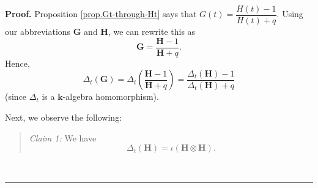 \documentclass[numbers=enddot,12pt,final,onecolumn,notitlepage]{scrartcl}%
\theoremstyle{definition}
\newenvironment{statement}{\begin{quote}}{\end{quote}}
\newenvironment{proof}[1][Proof]{\noindent\textbf{#1.} }{\ \rule{0.5em}{0.5em}}
\begin{document}
\begin{proof}
Proposition \ref{prop.Gt-through-Ht} says that $G\left(  t\right)
=\dfrac{H\left(  t\right)  -1}{H\left(  t\right)  +q}$. Using our
abbreviations $\mathbf{G}$ and $\mathbf{H}$, we can rewrite this as%
\begin{equation}
\mathbf{G}=\dfrac{\mathbf{H}-1}{\mathbf{H}+q}.
\label{pf.thm.Deltaetastara.G-via-H}%
\end{equation}
Hence,%
\begin{equation}
\Delta_{t}\left(  \mathbf{G}\right)  =\Delta_{t}\left(  \dfrac{\mathbf{H}%
-1}{\mathbf{H}+q}\right)  =\dfrac{\Delta_{t}\left(  \mathbf{H}\right)
-1}{\Delta_{t}\left(  \mathbf{H}\right)  +q}
\label{pf.thm.Deltaetastara.G-via-H2}%
\end{equation}
(since $\Delta_{t}$ is a $\mathbf{k}$-algebra homomorphism).

Next, we observe the following:

\begin{statement}
\textit{Claim 1:} We have%
\begin{equation}
\Delta_{t}\left(  \mathbf{H}\right)  =\iota\left(  \mathbf{H}\otimes
\mathbf{H}\right)  . \label{pf.thm.Deltaetastara.DeltaH}%
\end{equation}

\end{statement}


\end{proof}
\end{document}
